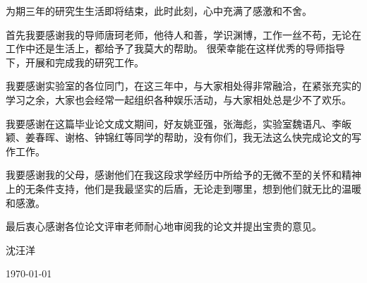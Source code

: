 ﻿
\begin{thanks}
为期三年的研究生生活即将结束，此时此刻，心中充满了感激和不舍。

首先我要感谢我的导师唐珂老师，他待人和善，学识渊博，工作一丝不苟，无论在工作中还是生活上，都给予了我莫大的帮助。
很荣幸能在这样优秀的导师指导下，开展和完成我的研究工作。

我要感谢实验室的各位同门，在这三年中，与大家相处得非常融洽，在紧张充实的学习之余，大家也会经常一起组织各种娱乐活动，与大家相处总是少不了欢乐。

我要感谢在这篇毕业论文成文期间，好友姚亚强，张海彪，实验室魏语凡、李皈颖、姜春晖、谢格、钟锦红等同学的帮助，没有你们，我无法这么快完成论文的写作工作。

我要感谢我的父母，感谢他们在我这段求学经历中所给予的无微不至的关怀和精神上的无条件支持，他们是我最坚实的后盾，无论走到哪里，想到他们就无比的温暖和感激。

最后衷心感谢各位论文评审老师耐心地审阅我的论文并提出宝贵的意见。
\begin{flushright}
沈汪洋

\today
\end{flushright}

\end{thanks}
